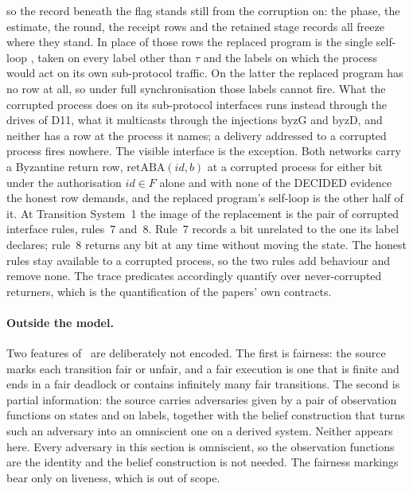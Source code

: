 \begin{itemize}
    so the record beneath the flag stands still from the corruption on: the
    phase, the estimate, the round, the receipt rows and the retained stage
    records all freeze where they stand.
    In place of those rows the replaced program is the single self-loop
    ,
    taken on every label other than $\tau$ and the labels on which the process
    would act on its own sub-protocol traffic.
    On the latter the replaced program has no row at all, so under full
    synchronisation those labels cannot fire.
    What the corrupted process does on its sub-protocol interfaces runs instead
    through the drives of D11, what it multicasts through the injections
    $\mathrm{byzG}$ and $\mathrm{byzD}$, and neither has a row at the process it
    names; a delivery addressed to a corrupted process fires nowhere.
    The visible interface is the exception.
    Both networks carry a Byzantine return row, $\mathrm{retABA}(id,b)$ at a
    corrupted process for either bit under the authorisation $id \in F$ alone
    and with none of the DECIDED evidence the honest row demands, and the
    replaced program's self-loop is the other half of it.
    At Transition System~1 the image of the replacement is the pair of
    corrupted interface rules, rules~7 and~8.
    Rule~7 records a bit unrelated to the one its label declares; rule~8 returns
    any bit at any time without moving the state.
    The honest rules stay available to a corrupted process, so the two rules add
    behaviour and remove none.
    The trace predicates accordingly quantify over never-corrupted returners,
    which is the quantification of the papers' own contracts.
\end{itemize}

\paragraph{Outside the model.}
Two features of~\cite{LeslieBP} are deliberately not encoded.
The first is fairness: the source marks each transition fair or unfair, and a
fair execution is one that is finite and ends in a fair deadlock or contains
infinitely many fair transitions.
The second is partial information: the source carries adversaries given by a
pair of observation functions on states and on labels, together with the belief
construction that turns such an adversary into an omniscient one on a derived
system.
Neither appears here.
Every adversary in this section is omniscient, so the observation functions are
the identity and the belief construction is not needed.
The fairness markings bear only on liveness, which is out of scope.

